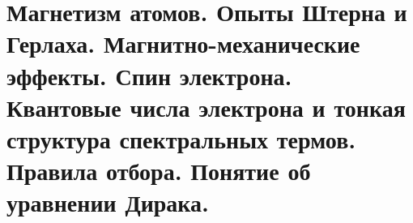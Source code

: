 \chapter{Магнетизм атомов. Опыты Штерна и Герлаха. Магнитно-механические 
эффекты. Спин электрона. Квантовые числа электрона и тонкая структура 
спектральных термов. Правила отбора. Понятие об уравнении Дирака.}

\newpage
